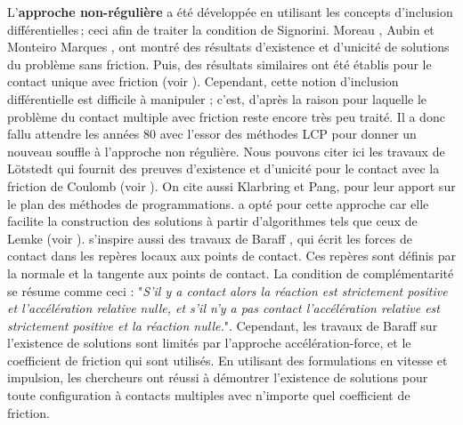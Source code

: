 L'\textbf{approche non-régulière} a été développée en utilisant les concepts d'inclusion différentielles ; ceci afin de traiter la condition de Signorini. Moreau \parencite{moreau1985standard}, Aubin \parencite{aubin2012differential} et Monteiro Marques \parencite{monteiro1985chocs}, ont montré des résultats d’existence et d’unicité de solutions du problème sans friction. Puis, des résultats similaires ont été établis pour le contact unique avec friction (voir \parencite{moreau1986dynamique,monteiro1988inclusoes,panagiotopoulos2012inequality,jean1985system,monteiro1994existence}). Cependant, cette notion d'inclusion différentielle est difficile à manipuler ; c'est, d'après \citeauthor{rabatel2015thesis} la raison pour laquelle le problème du contact multiple avec friction reste encore très peu traité. Il a donc fallu attendre les années 80 avec l'essor des méthodes LCP pour donner un nouveau souffle à l'approche non régulière. Nous pouvons citer ici les travaux de Lötstedt qui fournit des preuves d’existence et d’unicité pour le contact avec la friction de Coulomb (voir \parencite{lotstedt1981coulomb,lotstedt1982mechanical,lotstedt1982time}). On cite aussi Klarbring et Pang, pour leur apport sur le plan des méthodes de programmations. \parencite{rabatel2015thesis} a opté pour cette approche car elle facilite la construction des solutions à partir d’algorithmes tels que ceux de Lemke (voir \parencite{lemke1978some}). \citeauthor{rabatel2015thesis} s'inspire aussi des travaux de Baraff \parencite{baraff1993issues}, qui écrit les forces de contact dans les repères locaux aux points de contact. Ces repères sont définis par la normale et la tangente aux points de contact. La condition de complémentarité se résume comme ceci : "\textit{S’il y a contact alors la réaction est strictement positive et l’accélération relative nulle, et s’il n’y a pas contact l’accélération relative est strictement positive et la réaction nulle.}". Cependant, les travaux de Baraff sur l'existence de solutions sont limités par l'approche accélération-force, et le coefficient de friction qui sont utilisés. En utilisant des formulations en vitesse et impulsion, les chercheurs ont réussi à démontrer l’existence de solutions pour toute configuration à contacts multiples avec n’importe quel coefficient de friction.


